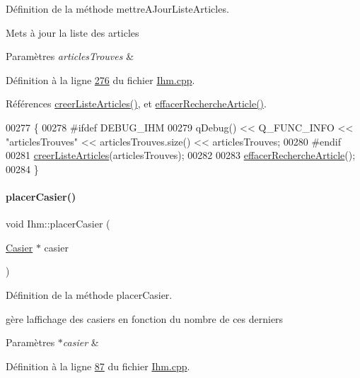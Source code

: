 Définition de la méthode mettre\+A\+Jour\+Liste\+Articles. 

Mets à jour la liste des articles 
\begin{DoxyParams}{Paramètres}
{\em articles\+Trouves} & \\
\hline
\end{DoxyParams}


Définition à la ligne \hyperlink{_ihm_8cpp_source_l00276}{276} du fichier \hyperlink{_ihm_8cpp_source}{Ihm.\+cpp}.



Références \hyperlink{_ihm_8cpp_source_l00367}{creer\+Liste\+Articles()}, et \hyperlink{_ihm_8cpp_source_l00266}{effacer\+Recherche\+Article()}.


\begin{DoxyCode}
00277 \{
00278 \textcolor{preprocessor}{    #ifdef DEBUG\_IHM}
00279         qDebug() << Q\_FUNC\_INFO << \textcolor{stringliteral}{"articlesTrouves"} << articlesTrouves.size() << articlesTrouves;
00280 \textcolor{preprocessor}{    #endif}
00281     \hyperlink{class_ihm_ab632796a21015964c8d7615edb09261c}{creerListeArticles}(articlesTrouves);
00282 
00283     \hyperlink{class_ihm_acb37df89789d7c82be7336519091bc1f}{effacerRechercheArticle}();
00284 \}
\end{DoxyCode}
\mbox{\label{class_ihm_a4ba75b0606c75d616dab3afd67660fd4}} 
\paragraph{\texorpdfstring{placer\+Casier()}{placerCasier()}}
{\footnotesize\ttfamily void Ihm\+::placer\+Casier (\begin{DoxyParamCaption}\item[{\hyperlink{class_casier}{Casier} $\ast$}]{casier }\end{DoxyParamCaption})}



Définition de la méthode placer\+Casier. 

gère l\textquotesingle{}affichage des casiers en fonction du nombre de ces derniers 
\begin{DoxyParams}{Paramètres}
{\em $\ast$casier} & \\
\hline
\end{DoxyParams}


Définition à la ligne \hyperlink{_ihm_8cpp_source_l00087}{87} du fichier \hyperlink{_ihm_8cpp_source}{Ihm.\+cpp}.



